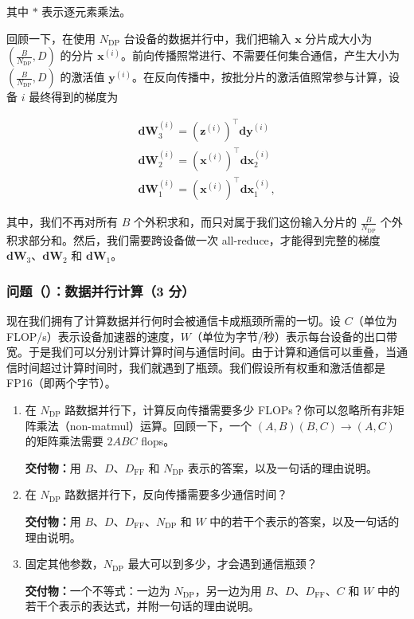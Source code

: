 其中 $*$ 表示逐元素乘法。

回顾一下，在使用 $N_{\mathrm{DP}}$ 台设备的数据并行中，我们把输入 $\boldsymbol{x}$ 分片成大小为 $\left(\frac{B}{N_{\mathrm{DP}}},D\right)$ 的分片 $\boldsymbol{x}^{(i)}$。前向传播照常进行、不需要任何集合通信，产生大小为 $\left(\frac{B}{N_{\mathrm{DP}}},D\right)$ 的激活值 $\boldsymbol{y}^{(i)}$。在反向传播中，按批分片的激活值照常参与计算，设备 $i$ 最终得到的梯度为

\begin{gather}
\boldsymbol{dW}_3^{(i)} = \left(\boldsymbol{z}^{(i)}\right)^{\top}\boldsymbol{dy}^{(i)} \tag{31}\\
\boldsymbol{dW}_2^{(i)} = \left(\boldsymbol{x}^{(i)}\right)^{\top}\boldsymbol{dx}_2^{(i)} \tag{32}\\
\boldsymbol{dW}_1^{(i)} = \left(\boldsymbol{x}^{(i)}\right)^{\top}\boldsymbol{dx}_1^{(i)}, \tag{33}
\end{gather}

其中，我们不再对所有 $B$ 个外积求和，而只对属于我们这份输入分片的 $\frac{B}{N_{\mathrm{DP}}}$ 个外积求部分和。然后，我们需要跨设备做一次 all-reduce，才能得到完整的梯度 $\boldsymbol{dW}_3$、$\boldsymbol{dW}_2$ 和 $\boldsymbol{dW}_1$。

\subsubsection*{问题（）：数据并行计算（3 分）}

现在我们拥有了计算数据并行何时会被通信卡成瓶颈所需的一切。设 $C$（单位为 FLOP/s）表示设备加速器的速度，$W$（单位为字节/秒）表示每台设备的出口带宽。于是我们可以分别计算计算时间与通信时间。由于计算和通信可以重叠，当通信时间超过计算时间时，我们就遇到了瓶颈。我们假设所有权重和激活值都是 FP16（即两个字节）。

\begin{enumerate}[label=(\alph*)]
  \item 在 $N_{\mathrm{DP}}$ 路数据并行下，计算反向传播需要多少 FLOPs？你可以忽略所有非矩阵乘法（non-matmul）运算。回顾一下，一个 $(A,B)(B,C)\to(A,C)$ 的矩阵乘法需要 $2ABC$ flops。

  \textbf{交付物：}用 $B$、$D$、$D_{\mathrm{FF}}$ 和 $N_{\mathrm{DP}}$ 表示的答案，以及一句话的理由说明。

  \item 在 $N_{\mathrm{DP}}$ 路数据并行下，反向传播需要多少通信时间？

  \textbf{交付物：}用 $B$、$D$、$D_{\mathrm{FF}}$、$N_{\mathrm{DP}}$ 和 $W$ 中的若干个表示的答案，以及一句话的理由说明。

  \item 固定其他参数，$N_{\mathrm{DP}}$ 最大可以到多少，才会遇到通信瓶颈？

  \textbf{交付物：}一个不等式：一边为 $N_{\mathrm{DP}}$，另一边为用 $B$、$D$、$D_{\mathrm{FF}}$、$C$ 和 $W$ 中的若干个表示的表达式，并附一句话的理由说明。
\end{enumerate}

